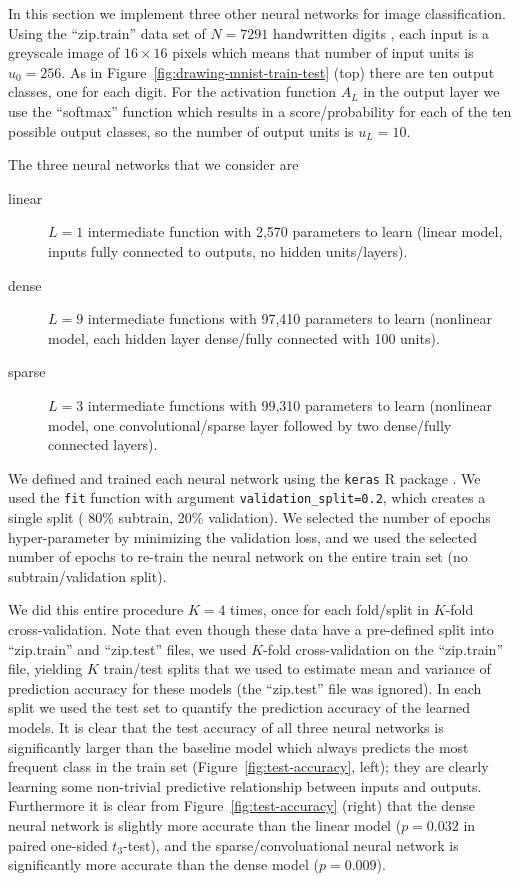 \documentclass[12pt]{article}
\begin{document}
In this section we implement three other neural networks for image
classification. Using the ``zip.train'' data set of $N=7291$
handwritten digits \citep{Hastie2009}, each input is a greyscale image
of $16\times 16$ pixels which means that number of input units is
$u_0=256$. As in Figure~\ref{fig:drawing-mnist-train-test} (top) there
are ten output classes, one for each digit. For the activation
function $A_L$ in the output layer we use the ``softmax'' function
which results in a score/probability for each of the ten possible
output classes, so the number of output units is $u_L=10$.

The three neural networks that we consider are
\begin{description}
\item[linear] $L=1$ intermediate function with 2,570 parameters to
  learn (linear model, inputs fully connected to outputs, no hidden
  units/layers).
\item[dense] $L=9$ intermediate functions with 97,410 parameters to
  learn (nonlinear model, each hidden layer dense/fully connected with
  100 units).
\item[sparse] $L=3$ intermediate functions with 99,310 parameters to
  learn (nonlinear model, one convolutional/sparse layer followed
  by two dense/fully connected layers).
\end{description}
We defined and trained each neural network using the \texttt{keras} R
package \citep{Allaire2020}. We used the \texttt{fit} function with
argument \verb|validation_split=0.2|, which creates a single split (
80\% subtrain, 20\% validation). We selected the number of epochs
hyper-parameter by minimizing the validation loss, and we used the
selected number of epochs to re-train the neural network on the entire
train set (no subtrain/validation split).

We did this entire procedure $K=4$ times, once for each fold/split in
$K$-fold cross-validation. Note that even though these data have a
pre-defined split into ``zip.train'' and ``zip.test'' files, we used
$K$-fold cross-validation on the ``zip.train'' file, yielding $K$
train/test splits that we used to estimate mean and variance of
prediction accuracy for these models (the ``zip.test'' file was
ignored). In each split we used the test set to quantify the
prediction accuracy of the learned models. It is clear that the test
accuracy of all three neural networks is significantly larger than the
baseline model which always predicts the most frequent class in the
train set (Figure~\ref{fig:test-accuracy}, left); they are clearly
learning some non-trivial predictive relationship between inputs and
outputs. Furthermore it is clear from Figure~\ref{fig:test-accuracy}
(right) that the dense neural network is slightly more accurate than
the linear model ($p=0.032$ in paired one-sided $t_3$-test), and the
sparse/convoluational neural network is significantly more accurate
than the dense model ($p=0.009$).
\end{document}

